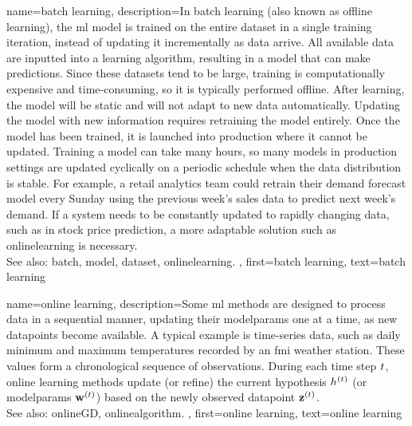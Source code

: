 {name={batch learning},
	description={In \gls{batch} learning (also known as offline learning), the \gls{ml} \gls{model} 
		is trained on the entire \gls{dataset} in a single training iteration, instead of updating it incrementally as \gls{data} arrive. 
		All available \gls{data} are inputted into a learning \gls{algorithm}, resulting in a \gls{model} that can make \glspl{prediction}. 
		Since these \glspl{dataset} tend to be large, training is computationally expensive and time-consuming, 
		so it is typically performed offline. After learning, the \gls{model} will be static and will not adapt to new \gls{data} automatically. 
		Updating the \gls{model} with new information requires retraining the \gls{model} entirely. Once the \gls{model} has been trained, 
		it is launched into production where it cannot be updated. Training a \gls{model} can take many hours, so many \glspl{model} in production 
		settings are updated cyclically on a periodic schedule when the \gls{data} distribution is stable. For example, a retail analytics team 
		could retrain their demand forecast \gls{model} every Sunday using the previous week's sales \gls{data} to predict next week's demand. 
		If a system needs to be constantly updated to rapidly changing \gls{data}, such as in stock price \gls{prediction}, a more adaptable solution 
		such as \gls{onlinelearning} is necessary.
		\\
		See also: \gls{batch}, \gls{model}, \gls{dataset}, \gls{onlinelearning}. },
	first={batch learning}, 
	text={batch learning}
}

{name={online learning},
	description={Some \gls{ml} methods  are designed to process \gls{data} in a sequential 
		manner, updating their \gls{modelparams} one at a time, as new \glspl{datapoint} become available. 
		A typical example is time-series \gls{data}, such as daily \gls{minimum} and \gls{maximum} temperatures 
		recorded by an \gls{fmi} weather station. These values form a chronological sequence 
		of observations. During each time step $t$, online learning methods update (or refine)  
		the current \gls{hypothesis} $h^{(t)}$ (or \gls{modelparams} ${\bf w}^{(t)}$) 
		based on the newly observed \gls{datapoint} ${\bf z}^{(t)}$. 
		\\ 
		See also: \gls{onlineGD}, \gls{onlinealgorithm}. },
	first={online learning},
	text={online learning} 
}

